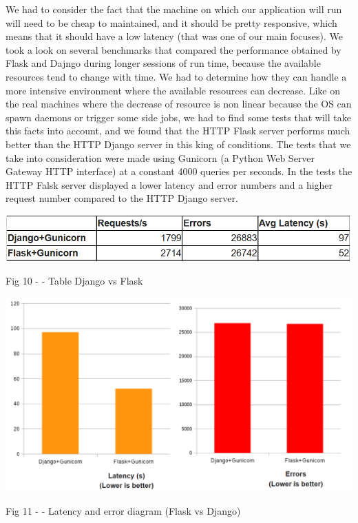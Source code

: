 \documentclass[12pt, a4paper]{report}
\begin{document}
We had to consider the fact that the machine on which our application will run will need to be cheap to maintained, and it should be pretty responsive, which means that it should have a low latency (that was one of our main focuses). We took a look on several benchmarks that compared the performance obtained by Flask and Dajngo during longer sessions of run time, because the available resources tend to change with time. We had to determine how they can handle a more intensive environment where the available resources can decrease. Like on the real machines where the decrease of resource is non linear because the OS can spawn daemons or trigger some side jobs, we had to find some tests that will take this facts into account, and we found that the HTTP Flask server performs much better than the HTTP Django server in this king of conditions. The tests that we take into consideration \cite{Flask2} were made using Gunicorn (a Python Web Server Gateway HTTP interface) at a constant 4000 queries per seconds. In the tests the HTTP Falsk server displayed a lower latency and  error numbers and a higher request number compared to the HTTP Django server.
\par 

\bigskip
\includegraphics[scale=0.7, center]{django-flask-table.png}
\begin{center}
Fig 10 - \cite{Flask2} - Table Django vs Flask 
\end{center}

\medskip
\includegraphics[scale=0.6, center]{django-flask-latency.png}
\begin{center}
Fig 11 - \cite{Flask2} - Latency and error diagram (Flask vs Django)
\end{center}
\end{document}
